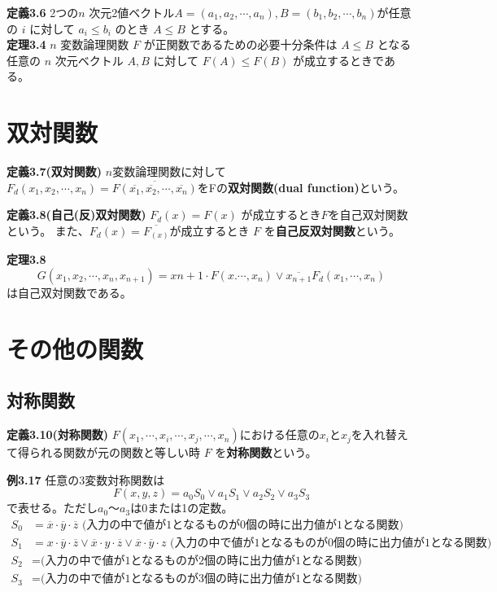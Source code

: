 \documentclass[a4j,10pt,oneside,openany,fleqn]{jsbook}
\begin{document}
\textbf{定義3.6} 2つの$n$ 次元2値ベクトル$A = (a_1, a_2, \cdots, a_n), B = (b_1, b_2, \cdots, b_n)$が任意の $i$ に対して $a_i \leq b_i$ のとき $A \leq B$ とする。\\
\textbf{定理3.4} $n$ 変数論理関数 $F$ が正関数であるための必要十分条件は $A \leq B$ となる任意の $n$ 次元ベクトル $A,B$ に対して $F(A) \leq F(B)$ が成立するときである。\\

\section{双対関数}
\textbf{定義3.7(双対関数)}
$n$変数論理関数に対して $F_d(x_1, x_2, \cdots , x_n) = \overline{F(\overline{x_1}, \overline{x_2}, \cdots, \overline{x_n})}$をFの\textbf{双対関数(dual function)}という。

\textbf{定義3.8(自己(反)双対関数)}
$F_d(x) = F(x)$ が成立するとき$F$を自己双対関数という。
また、$F_d(x) = \overline{F_(x)}$が成立するとき $F$ を\textbf{自己反双対関数}という。

\textbf{定理3.8}
\[
G(x_1, x_2, \cdots, x_n, x_{n+1}) = x{n+1} \cdot F(x. \cdots, x_n) \vee \overline{x_{n+1}}F_d(x_1, \cdots, x_n)
\]
は自己双対関数である。

\section{その他の関数}
\subsection{対称関数}
\textbf{定義3.10(対称関数)}
$F(x_1, \cdots,x_i,\cdots, x_j, \cdots, x_n)$における任意の$x_i$と$x_j$を入れ替えて得られる関数が元の関数と等しい時 $F$ を\textbf{対称関数}という。

\textbf{例3.17}
任意の3変数対称関数は
\[
F(x,y,z) = a_0S_0 \vee a_1S_1 \vee a_2S_2 \vee a_3S_3
\]
で表せる。ただし$a_0$〜$a_3$は0または1の定数。
\begin{align*}
S_0 &= \overline{x} \cdot \overline{y} \cdot \overline{z}\textrm{ (入力の中で値が1となるものが0個の時に出力値が1となる関数)}&\\
S_1 &= x \cdot \overline{y} \cdot \overline{z} \vee \overline{x} \cdot y \cdot \overline{z} \vee \overline{x} \cdot \overline{y} \cdot z \textrm{ (入力の中で値が1となるものが0個の時に出力値が1となる関数)}&\\
S_2 &= \textrm{(入力の中で値が1となるものが2個の時に出力値が1となる関数)}\\
S_3 &= \textrm{(入力の中で値が1となるものが3個の時に出力値が1となる関数)}\\
\end{align*}
\end{document}
